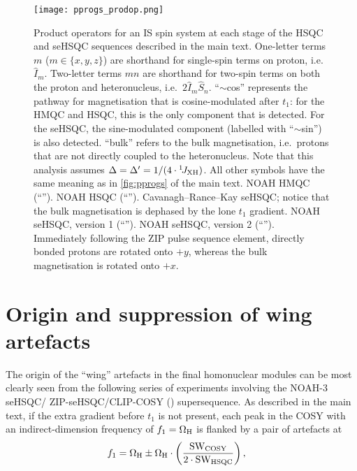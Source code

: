 \begin{figure}
    \centering
    \texttt{[image: pprogs\_prodop.png]}
    {\label{fig:pprogs_prodop_hmqc}}
    {\label{fig:pprogs_prodop_hsqc}}
    {\label{fig:pprogs_prodop_crk}}
    {\label{fig:pprogs_prodop_spv1}}
    {\label{fig:pprogs_prodop_spv2}}
    \caption{
        Product operators for an IS spin system at each stage of the HSQC and seHSQC sequences described in the main text.
        One-letter terms $m$ ($m \in \{x, y, z\}$) are shorthand for single-spin terms on proton, i.e.\ $\hat{I}_m$.
        Two-letter terms $mn$ are shorthand for two-spin terms on both the proton and heteronucleus, i.e.\ $2\hat{I}_m\hat{S}_n$.
        ``$\sim$cos'' represents the pathway for  magnetisation that is cosine-modulated after $t_1$: for the HMQC and HSQC, this is the only component that is detected.
        For the seHSQC, the sine-modulated  component (labelled with ``$\sim$sin'') is also detected.
        ``bulk'' refers to the bulk  magnetisation, i.e.\ protons that are not directly coupled to the heteronucleus.
        Note that this analysis assumes $\Delta = \Delta' = 1/(4\cdot\onejxh)$.
        All other symbols have the same meaning as in \cref{fig:pprogs} of the main text.
        \textbf{} NOAH HMQC (``\noahM{}'').
        \textbf{} NOAH HSQC (``\noahS{}'').
        \textbf{} Cavanagh--Rance--Kay seHSQC; notice that the bulk magnetisation is dephased by the lone $t_1$ gradient.
        \textbf{} NOAH seHSQC, version 1 (``\noahSpa{}'').
        \textbf{} NOAH seHSQC, version 2 (``\noahSpb{}'').
        Immediately following the ZIP pulse sequence element, directly bonded protons are rotated onto $+y$, whereas the bulk magnetisation is rotated onto $+x$.
    }
    \label{fig:pprogs_prodop}
\end{figure}

\section{Origin and suppression of wing artefacts}

The origin of the ``wing'' artefacts in the final homonuclear modules can be most clearly seen from the following series of experiments involving the NOAH-3 \nitrogen{} seHSQC/\carbon{} ZIP-seHSQC/CLIP-COSY () supersequence.
As described in the main text, if the extra gradient before $t_1$ is not present, each peak in the COSY with an indirect-dimension frequency of $f_1 = \Omega_{\ce{H}}$ is flanked by a pair of artefacts at
\begin{align*}
    f_1 &= \Omega_{\ce{H}} \pm \Omega_{\ce{H}} \cdot \left(\frac{\mathrm{SW_{COSY}}}{2 \cdot \mathrm{SW_{HSQC}}}\right),
\end{align*}


